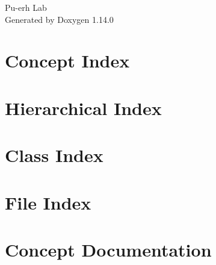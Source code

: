 \documentclass[twoside]{book}
\newcommand{\+}{\discretionary{\mbox{\scriptsize$\hookleftarrow$}}{}{}}
\newcommand{\clearemptydoublepage}{%
    \newpage{\pagestyle{empty}\cleardoublepage}%
  }
\begin{document}
  \raggedbottom
    \hypersetup{pageanchor=false,
                bookmarksnumbered=true,
                pdfencoding=unicode
               }
  \begin{titlepage}
  \vspace*{7cm}
  \begin{center}%
  {\Large Pu-\/erh Lab}\\
  \vspace*{1cm}
  {\large Generated by Doxygen 1.14.0}\\
  \end{center}
  \end{titlepage}
  \clearemptydoublepage
  \tableofcontents
  \clearemptydoublepage
  \hypersetup{pageanchor=true}
\chapter{Concept Index}

\chapter{Hierarchical Index}

\chapter{Class Index}

\chapter{File Index}

\chapter{Concept Documentation}


\end{document}
